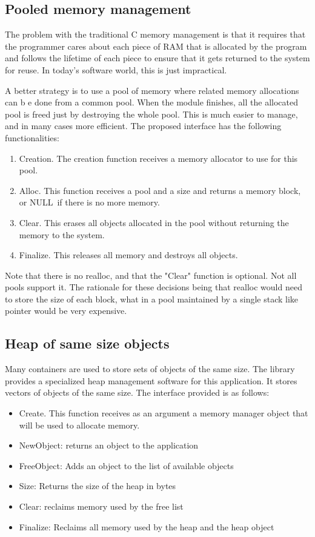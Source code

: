 \documentclass[12pt,a4paper]{memoir} %
\newif\iftth
\newcommand{\Null}{{\iftth \ NULL \else \footnotesize NULL\  \fi}}
\begin{document}
\subsection{Pooled memory management}
The problem with the traditional C memory management is that it requires that the programmer cares about each piece of RAM that is allocated by the program and follows the lifetime of each piece to ensure that it gets returned to the system for reuse. In today's software world, this is just impractical.

A better strategy is to use a pool of memory where related memory allocations can b e done from a common pool. When the module finishes, all the allocated pool is freed just by destroying the whole pool. This is much easier to manage, and in many cases more efficient.
The proposed interface has the following functionalities:
\begin{enumerate}
\item Creation. The creation function receives a memory allocator to use for this pool.
\item Alloc. This function receives a pool and a size and returns a memory block, or \Null if there is no more memory.
\item Clear. This erases all objects allocated in the pool without returning the memory to the system.
\item Finalize. This releases all memory and destroys all objects.
\end{enumerate}
Note that there is no realloc, and that the "Clear" function is optional. Not all pools support it. The rationale for these decisions being that realloc would need to store the size of each block, what in a pool maintained by a single stack like pointer would be very expensive.
\subsection{Heap of same size objects}
Many containers are used to store sets of objects of the same size. The library provides a specialized heap management software for this application. It stores vectors of objects of the same size. The interface provided is as follows:
\begin{itemize}
\item Create. This function receives as an argument a memory manager object that will be used to allocate memory.
\item NewObject: returns an object to the application
\item FreeObject: Adds an object to the list of available objects
\item Size: Returns the size of the heap in bytes
\item Clear: reclaims memory used by the free list
\item Finalize: Reclaims all memory used by the heap and the heap object
\end{itemize}
\end{document}
